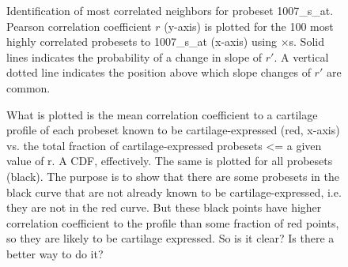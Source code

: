 \documentclass{bioinfo}
\begin{document}

\begin{figure}[!tpb]
\label{figure:cortip}
\centerline{}
\caption{Identification of most correlated neighbors for probeset 1007\_s\_at.
Pearson correlation coefficient $r$ (y-axis) is plotted for the 100 most highly
correlated probesets to 1007\_s\_at (x-axis) using $\times$s.  Solid lines
indicates the probability of a change in slope of $r\prime$.  A vertical dotted
line indicates the position above which slope changes of $r\prime$ are common.}
\end{figure}


\begin{figure}[!tpb]
\label{figure:cartilage_cdf}
\centerline{}
\caption{What is plotted is the mean correlation coefficient to a cartilage profile of
each probeset known to be cartilage-expressed (red, x-axis) vs. the total
fraction of cartilage-expressed probesets <= a given value of r.  A CDF,
effectively.  The same is plotted for all probesets (black).  The purpose is to
show that there are some probesets in the black curve that are not already
known to be cartilage-expressed, i.e. they are not in the red curve.  But these
black points have higher correlation coefficient to the profile than some
fraction of red points, so they are likely to be cartilage expressed.  So is it
clear?  Is there a better way to do it?}
\end{figure}
\end{document}
